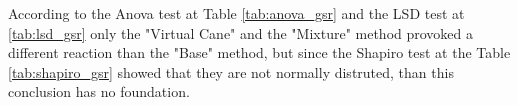 According to the Anova test at Table \ref{tab:anova_gsr} and the LSD test at \ref{tab:lsd_gsr} only the "Virtual Cane" and the "Mixture" method provoked a different reaction than the "Base" method, but since the Shapiro test at the Table \ref{tab:shapiro_gsr} showed that they are not normally distruted, than this conclusion has no foundation.

\FloatBarrier

